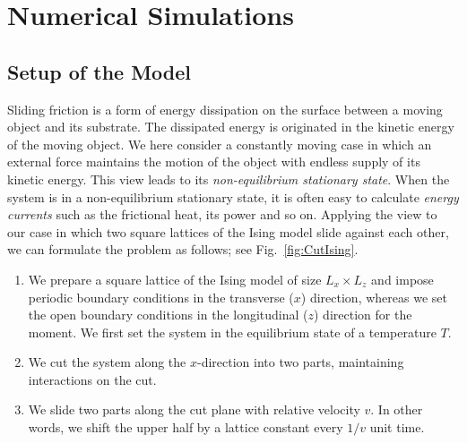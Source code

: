 \chapter{Numerical Simulations}\label{chap:NumSim}

\section{Setup of the Model}\label{sec:SetupModel}
Sliding friction is a form of energy dissipation on the surface between a moving object and its substrate. The dissipated energy is originated in the kinetic energy of the moving object. We here consider a constantly moving case in which an external force maintains the motion of the object with endless supply of its kinetic energy. This view leads to its \textit{non-equilibrium stationary state}. When the system is in a non-equilibrium stationary state, it is often easy to calculate \textit{energy currents} such as the frictional heat, its power and so on. Applying the view to our case in which two square lattices of the Ising model slide against each other, we can formulate the problem as follows; see Fig.~\ref{fig:CutIsing}.
\begin{enumerate}
	\item We prepare a square lattice of the Ising model of size $L_{x}\times L_{z}$ and impose periodic boundary conditions in the transverse ($x$) direction, whereas we set the open boundary conditions in the longitudinal ($z$) direction for the moment. We first set the system in the equilibrium state of a temperature $T$.
	\item We cut the system along the $x$-direction into two parts, maintaining interactions on the cut.
	\item We slide two parts along the cut plane with relative velocity $v$. In other words, we shift the upper half by a lattice constant every $1/v$ unit time. 
\end{enumerate}

